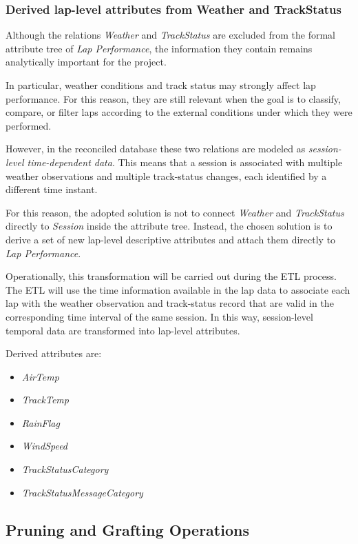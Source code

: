\documentclass[a4paper,11pt]{article}
\begin{document}
	\subsubsection{Derived lap-level attributes from Weather and TrackStatus}
	
	Although the relations \textit{Weather} and \textit{TrackStatus} are excluded from the formal attribute tree of \textit{Lap Performance}, the information they contain remains analytically important for the project.
	
	In particular, weather conditions and track status may strongly affect lap performance.
	For this reason, they are still relevant when the goal is to classify, compare, or filter laps according to the external conditions under which they were performed.
	
	However, in the reconciled database these two relations are modeled as \textit{session-level time-dependent data}.
	This means that a session is associated with multiple weather observations and multiple track-status changes, each identified by a different time instant.
	
	For this reason, the adopted solution is not to connect \textit{Weather} and \textit{TrackStatus} directly to \textit{Session} inside the attribute tree.
	Instead, the chosen solution is to derive a set of new lap-level descriptive attributes and attach them directly to \textit{Lap Performance}.
	
	Operationally, this transformation will be carried out during the ETL process.
	The ETL will use the time information available in the lap data to associate each lap with the weather observation and track-status record that are valid in the corresponding time interval of the same session.
	In this way, session-level temporal data are transformed into lap-level attributes.
	
	Derived attributes are:
	\begin{itemize}
		\item \textit{AirTemp}
		\item \textit{TrackTemp}
		\item \textit{RainFlag}
		\item \textit{WindSpeed}
		\item \textit{TrackStatusCategory}
		\item \textit{TrackStatusMessageCategory}
	\end{itemize}
	

	\subsection{Pruning and Grafting Operations}
	
\end{document}
